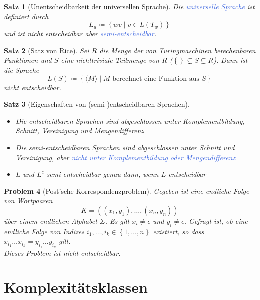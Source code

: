 \documentclass[11pt]{scrartcl}
\newcommand{\tcol}[1]{\textcolor{RoyalBlue}{#1}}
\newcommand{\set}[1]{\left\lbrace #1\right\rbrace}
\theoremstyle{break}
\newtheorem{satz}{Satz}[section]
\newtheorem{prob}[satz]{Problem}
\begin{document}
    \begin{satz}[Unentscheidbarkeit der universellen Sprache]
        Die \tcol{universelle Sprache} ist definiert durch
        \[L_u\coloneqq\set{wv\mid v\in L(T_w)}\]
        und ist nicht entscheidbar aber \tcol{semi-entscheidbar}.
    \end{satz}

    \begin{satz}[Satz von Rice]
        Sei $R$ die Menge der von Turingmaschinen berechenbaren Funktionen und $S$ eine nichttriviale Teilmenge von $R$ ($\set{}\subsetneq S\subsetneq R$).
        Dann ist die Sprache \[L(S)\coloneqq\set{\langle M\rangle\mid M\text{ berechnet eine Funktion aus }S}\]
        nicht entscheidbar.
    \end{satz}

    \begin{satz}[Eigenschaften von (semi-)entscheidbaren Sprachen]
        \begin{itemize}
            \item Die entscheidbaren Sprachen sind abgeschlossen unter Komplementbildung, Schnitt, Vereinigung und Mengendifferenz
            \item Die semi-entscheidbaren Sprachen sind abgeschlossen unter Schnitt und Vereinigung, aber \tcol{nicht unter Komplementbildung oder Mengendifferenz}
            \item $L$ und $L^c$ semi-entscheidbar genau dann, wenn $L$ entscheidbar
        \end{itemize}
    \end{satz}

    \begin{prob}[Post'sche Korrespondenzproblem]
        Gegeben ist eine endliche Folge von Wortpaaren
        \[K=((x_1,y_1),\dots,(x_n,y_n))\]
        über einem endlichen Alphabet $\Sigma$.
        Es gilt $x_i\neq\epsilon$ und $y_i\neq\epsilon$.
        Gefragt ist, ob eine endliche Folge von Indizes $i_1,\dots,i_k\in\set{1,\dots,n}$ existiert, so dass $x_{i_1}\dots x_{i_k}=y_{i_1}\dots y_{i_k}$ gilt.\\
        Dieses Problem ist nicht entscheidbar.
    \end{prob}



    \section{Komplexitätsklassen}
	\label{sec:komplexitätsklassen}
\end{document}
